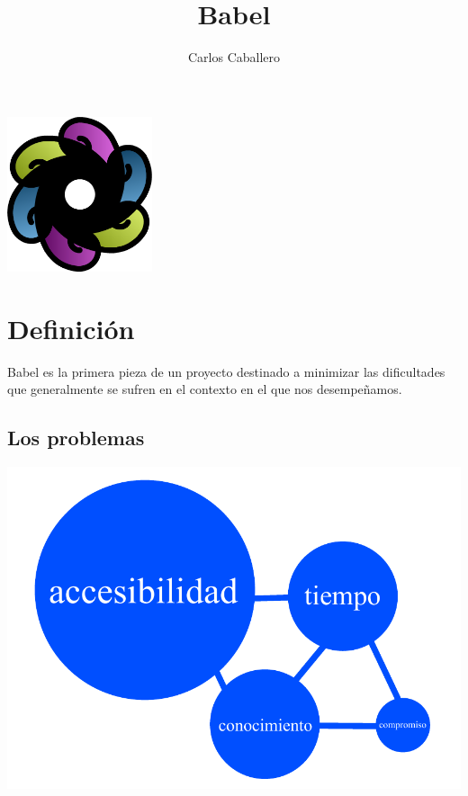 \documentclass[11pt]{beamer}
\title{\bf Babel}
\author{Carlos Caballero}
\institute{scesi}
\begin{document}
\begin{frame}
\hspace*{3.5cm}
\includegraphics[width=0.32\textwidth]{img/babel.png}
\titlepage
\end{frame}

\section{Definición}
\begin{frame}
Babel es la primera pieza de un proyecto destinado a minimizar las dificultades
que generalmente se sufren en el contexto en el que nos desempeñamos.
\end{frame}

\subsection{Los problemas}
\begin{frame}
\includegraphics[width=1.0\textwidth]{img/babel_1.pdf}
\end{frame}
\end{document}
